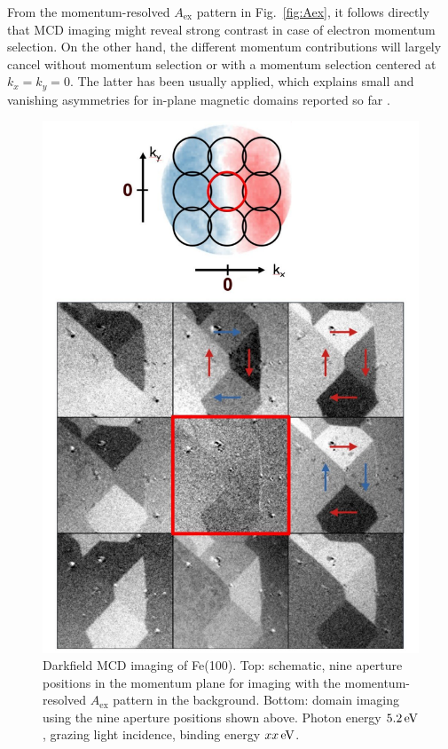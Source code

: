 \documentclass[prl,twocolumn,floatfix]{revtex4-2}
\begin{document}
From the momentum-resolved $A_{\mathrm{ex}}$ pattern in Fig.~\ref{fig:Aex}, it follows directly that MCD imaging might reveal strong contrast in case of electron momentum selection. On the other hand, the different momentum contributions will largely cancel without momentum selection or with a momentum selection centered at $k_x=k_y=0$. The latter has been usually applied, which explains small and vanishing asymmetries for in-plane magnetic domains reported so far \cite{marx2000}.
\begin{figure}
    \centering
    \includegraphics[width = 0.8\columnwidth]{Darkfield_overview.pdf}
    \caption{Darkfield MCD imaging of Fe(100). Top: schematic, nine aperture positions in the momentum plane for imaging with the momentum-resolved $A_{\mathrm{ex}}$ pattern in the background. Bottom: domain imaging using the nine aperture positions shown above. Photon energy $\unit[5.2]{eV}$, grazing light incidence, binding energy $\unit[xx]{eV}$.}
    \label{fig:Imaging}
\end{figure}
\end{document}
